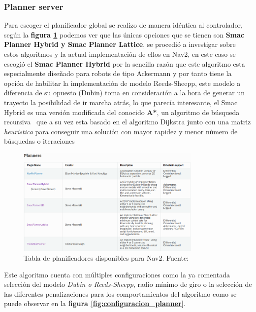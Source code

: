 \subsubsection{Planner server} 
Para escoger el planificador global se realizo de manera idéntica al controlador, según la \textbf{figura \ref{fig:planificadores_tabla}} podemos ver que las únicas opciones que se tienen son 
\textbf{Smac Planner Hybrid y Smac Planner Lattice}, se procedió a investigar sobre estos algoritmos y la actual implementación de ellos en Nav2, en este caso se escogió 
el \textbf{Smac Planner Hybrid} por la sencilla razón que este algoritmo esta especialmente diseñado para robots de tipo Ackermann y por tanto tiene la opción de habilitar 
la implementación de modelo Reeds-Sheepp, este modelo a diferencia de su opuesto (Dubin) toma en consideración a la hora de generar 
un trayecto la posibilidad de ir marcha atrás, lo que parecía interesante, el Smac Hybrid es una versión modificada 
del conocido \textbf{A*}, un algoritmo de búsqueda recursiva~\cite{dolgov2008practical} que a su vez esta basado en el algoritmo Dijkstra junto con una matriz 
\textit{heurística} para conseguir una solución con mayor rapidez y menor número de búsquedas o iteraciones 
\begin{figure}[h]
    \centering
    \includegraphics[width=0.8\textwidth]{images/planificadores_table.png}
    \caption{Tabla de planificadores disponibles para Nav2. Fuente: \cite{nav2}}
    \label{fig:planificadores_tabla}
\end{figure}

\newpage
Este algoritmo cuenta con múltiples configuraciones como la ya comentada selección del modelo \textit{Dubin o Reeds-Sheepp}, radio mínimo de giro 
o la selección de las diferentes penalizaciones para los comportamientos del algoritmo como se puede observar en la \textbf{figura \ref{fig:configuracion_planner}}.

